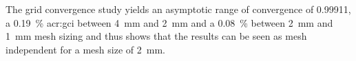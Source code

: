 The grid convergence study yields an asymptotic range of convergence of 0.99911, a \qty{0.19}{\percent} \gls{acr:gci} between \qty{4}{\milli\meter} and \qty{2}{\milli\meter} and a \qty{0.08}{\percent}  between \qty{2}{\milli\meter} and \qty{1}{\milli\meter} mesh sizing and thus shows that the results can be seen as mesh independent for a mesh size of \qty{2}{\milli\meter}.


